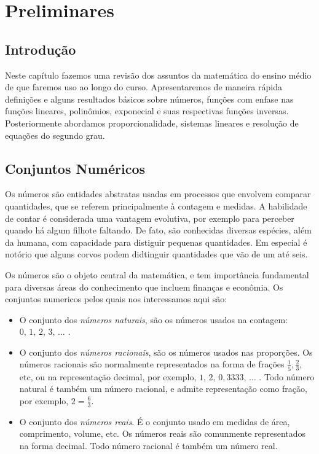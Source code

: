 \chapter{Preliminares}
\thispagestyle{empty}

\section{Introdução}


Neste capítulo fazemos uma revisão dos assuntos da matemática do ensino médio de que faremos uso ao longo do curso.
Apresentaremos de maneira rápida definições e alguns resultados básicos sobre números, funções com enfase nas funções lineares,
polinômios, exponecial e suas respectivas funções inversas. Posteriormente abordamos proporcionalidade,
 sistemas lineares e resolução de equações do segundo grau.

\section{Conjuntos Numéricos}

Os números são entidades abstratas usadas em processos que envolvem comparar quantidades, que se referem principalmente à contagem e medidas.
A habilidade de contar é considerada uma vantagem evolutiva, por exemplo para perceber quando há algum filhote faltando. De fato, são conhecidas diversas espécies,
além da humana,
com capacidade para distiguir pequenas quantidades. Em especial é notório que alguns corvos podem didtinguir quantidades que vão de um até seis.

Os números são o objeto central da matemática, e tem importância fundamental para diversas áreas do conhecimento que incluem finanças e econômia. Os conjuntos numericos pelos quais nos interessamos aqui são:
\begin{itemize}
\item[$\N$:] O conjunto dos \textit{números naturais}, são os números usados na contagem: $0,\,1,\,2,\,3,\,\ldots$ .
\item[$\Q$:] O conjunto dos \textit{números racionais}, são os números usados nas proporções. Os números
racionais são normalmente representados na forma de frações $\frac{1}{5}, \frac{2}{3}$, etc, ou na representação
decimal, por exemplo, $1,\,2,\,0,3333,\,\ldots$ . Todo número natural é também um número racional,
e admite representação como fração, por exemplo, $2=\frac{6}{3}$.
\item[$\R$:] O conjunto dos \textit{números reais}. É o conjunto usado em medidas de área,
comprimento, volume, etc. Os números reais são comunmente representados na forma decimal.
Todo número racional é também um número real.
\end{itemize}

